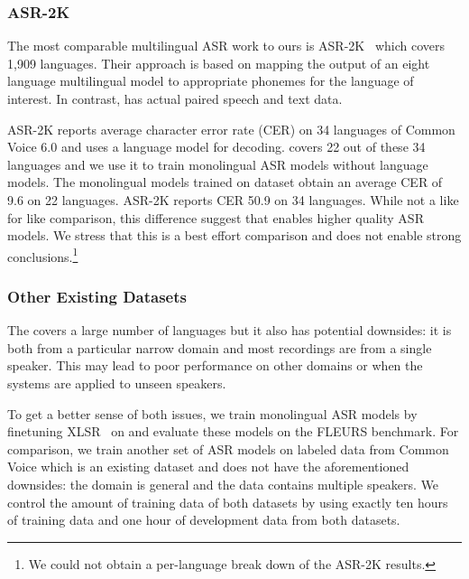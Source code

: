 \insertComparisonWithOtherDatasets



\subsubsection{ASR-2K}
\label{sec:data-comp-asr2k}

The most comparable multilingual ASR work to ours is ASR-2K~\citep{li2022asr2k} which covers 1,909 languages. 
Their approach is based on mapping the output of an eight language multilingual model to appropriate phonemes for the language of interest. 
In contrast, \MMS{} has actual paired speech and text data.

ASR-2K reports average character error rate (CER) on 34 languages of Common Voice 6.0 and uses a language model for decoding. 
\MMS{} covers 22 out of these 34 languages and we use it to train monolingual ASR models without language models.
The monolingual models trained on {\MMS} dataset obtain an average CER of 9.6 on 22 languages.
ASR-2K reports CER 50.9 on 34 languages.
While not a like for like comparison, this difference suggest that \MMS{} enables higher quality ASR models.
We stress that this is a best effort comparison and does not enable strong conclusions.\footnote{We could not obtain a per-language break down of the ASR-2K results.}


\subsubsection{Other Existing Datasets}
\label{sec:data-compdata}

The \MMS{} covers a large number of languages but it also has potential downsides:
it is both from a particular narrow domain and most recordings are from a single speaker. 
This may lead to poor performance on other domains or when the systems are applied to unseen speakers.

To get a better sense of both issues, we train monolingual ASR models by finetuning XLSR~\citep{babu22_interspeech} on \MMS{} and evaluate these models on the FLEURS benchmark.
For comparison, we train another set of ASR models on labeled data from Common Voice which is an existing dataset and does not have the aforementioned downsides: the domain is general and the data contains multiple speakers. 
We control the amount of training data of both datasets by using exactly ten hours of training data and one hour of development data from both datasets.

